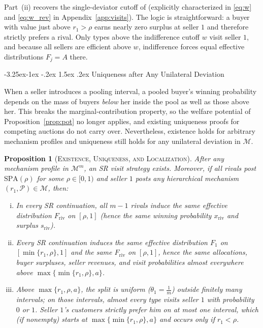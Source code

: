 \documentclass[12pt]{article}
\makeatletter
\newcommand{\citeasnoun}[1]{\citet{#1}}
\theoremstyle{mystyle}
\newtheorem{proposition}{Proposition}
\theoremstyle{mystyle2}
\newcommand{\mmpfont}{\scshape}
\renewcommand\subsection{\@startsection{subsection}{2}{\z@}%
                                     {-3.25ex\@plus -1ex \@minus -.2ex}%
                                     {1.5ex \@plus .2ex}%
                                     {\normalfont\normalsize\mmpfont}}
\newcommand{\M}{\mathcal{M}}
\newcommand{\cP}{\mathcal{P}}
\newcommand{\SPA}{\mathrm{SPA}}
\newcommand{\1}{\mathbf{1}}
\makeatother
\begin{document}
Part~(ii) recovers the single-deviator cutoff of \citeasnoun{burguet} (explicitly characterized in \eqref{eq:w} and \eqref{eq:w_rev} in Appendix~\ref{app:visits}). The logic is straightforward: a buyer with value just above $r_1>\rho$ earns nearly zero surplus at seller $1$ and therefore strictly prefers a rival. Only types above the indifference cutoff $w$ visit seller $1$, and because all sellers are efficient above $w$, indifference forces equal effective distributions $F_j=A$ there.

\subsection{Uniqueness after Any Unilateral Deviation}

When a seller introduces a pooling interval, a pooled buyer's winning probability depends on the mass of buyers \emph{below} her inside the pool as well as those above her. This breaks the marginal-contribution property, so the welfare potential of Proposition~\ref{prop:pot} no longer applies, and existing uniqueness proofs for competing auctions \citep{burguet,virag2010competing} do not carry over. Nevertheless, existence holds for arbitrary mechanism profiles and uniqueness still holds for any unilateral deviation in $\M$.

\begin{proposition}[\textsc{Existence, Uniqueness, and Localization}]\label{prop:unique}
After any mechanism profile in $\M^m$, an SR visit strategy exists. Moreover, if all rivals post $\SPA(\rho)$ for some $\rho\in[0,1)$ and seller $1$ posts any hierarchical mechanism $(r_1,\cP)\in\M$, then:
\begin{enumerate}[(i)]
\item In every SR continuation, all $m-1$ rivals induce the same effective distribution $F_{\mathrm{riv}}$ on $[\rho,1]$ (hence the same winning probability $x_{\mathrm{riv}}$ and surplus $s_{\mathrm{riv}}$).
\item Every SR continuation induces the same effective distribution $F_1$ on $[\min\{r_1,\rho\},1]$ and the same $F_{\mathrm{riv}}$ on $[\rho,1]$, hence the same allocations, buyer surpluses, seller revenues, and visit probabilities almost everywhere above $\max\{\min\{r_1,\rho\},a\}$.
\item Above $\max\{r_1,\rho,a\}$, the split is uniform ($\theta_1=\frac{1}{m}$) outside finitely many intervals; on those intervals, almost every type visits seller $1$ with probability $0$ or $1$. Seller $1$'s customers strictly prefer him on at most one interval, which (if nonempty) starts at $\max\{\min\{r_1,\rho\},a\}$ and occurs only if $r_1<\rho$.
\end{enumerate}
\end{proposition}
\end{document}
